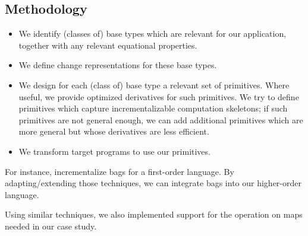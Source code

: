   \begin{oldSec}
\subsection{Methodology}
\label{ssec:methodology}


\begin{itemize}
\item We identify (classes of) base types which are relevant for
  our application, together with any relevant equational properties.
\item We define change representations for these base
  types.
\item We design for each (class of) base type a relevant set of
  primitives.  Where
  useful, we provide optimized derivatives for such primitives.
  We try to define primitives which capture
  incrementalizable computation skeletons; if such primitives are
  not general enough, we can add additional primitives which are
  more general but whose derivatives are less efficient.
\item We transform target programs to use our primitives.
\end{itemize}

For instance, \citet{GlucheGrust97Incr} incrementalize bags for a
first-order language. By adapting/extending those techniques, we
can integrate bags into our higher-order language.

Using similar techniques, we also implemented support for the
operation on maps needed in our case study.

\end{oldSec}



